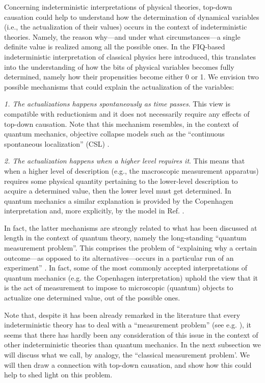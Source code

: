 \documentclass[12pt]{article}
\begin{document}
Concerning indeterministic interpretations of physical theories, top-down causation could help to understand how the determination of dynamical variables (i.e., the actualization of their values) occurs in the context of indeterministic theories. Namely, the reason why---and under what circumstances---a single definite value is realized among all the possible ones. In the FIQ-based indeterministic interpretation of classical physics here introduced, this translates into the understanding of how the bits of physical variables becomes fully determined, namely how their propensities become either 0 or 1. We envision two possible mechanisms that could explain the actualization of the variables:

\textit{1. The actualizations happens spontaneously as time passes}. This view is compatible with reductionism and it does not necessarily require any effects of top-down causation. Note that this mechanism resembles, in the context of quantum mechanics, objective collapse models such as the ``continuous spontaneous localization'' (CSL) \cite{gisincollapse, cls}. 

\textit{2. The actualization happens when a higher level requires it}. This means that when a higher level of description (e.g., the macroscopic measurement apparatus) requires some physical quantity pertaining to the lower-level description to acquire a determined value, then the lower level must get determined. In quantum mechanics a similar explanation is provided by the Copenhagen interpretation and, more explicitly, by the model in Ref. \cite{topdown2}.

In fact, the latter mechanisms are strongly related to what has been discussed at length in the context of quantum theory, namely the long-standing ``quantum measurement problem''. This comprises the problem of ``explaining why a certain outcome---as opposed to its alternatives---occurs in a particular run of an experiment'' \cite{brukner}. In fact, some of the most commonly accepted interpretations of quantum mechanics (e.g. the Copenhagen interpretation) uphold the view that it is the act of measurement to impose to microscopic (quantum) objects to actualize one determined value, out of the possible ones.

Note that, despite it has been already remarked in the literature that every indeterministic theory has to deal with a ``measurement problem'' (see e.g. \cite{brukner}), it seems that there has hardly been any consideration of this issue in the context of other indeterministic theories than quantum mechanics. In the next subsection we will discuss what we call, by analogy, the ``classical measurement problem'. We will then draw a connection with top-down causation, and show how this could help to shed light on this problem.
\end{document}
